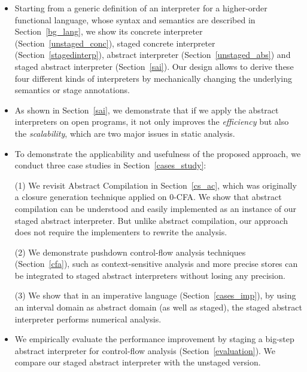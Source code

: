 \begin{itemize}
  \item Starting from a generic definition of an interpreter for a higher-order
    functional language, whose syntax and semantics are described in
    Section~\ref{bg_lang}, we show its concrete interpreter
    (Section~\ref{unstaged_conc}), staged concrete interpreter
    (Section~\ref{stagedinterp}), abstract interpreter (Section~\ref{unstaged_abs})
    and staged abstract interpreter (Section~\ref{sai}). Our design allows to
    derive these four different kinds of interpreters by mechanically changing the
    underlying semantics or stage annotations.
    
  \item As shown in Section~\ref{sai}, we demonstrate that if we apply the
    abstract interpreters on open programs, it not only improves the
    \textit{efficiency} but also the \textit{scalability}, which are two major
    issues in static analysis.
    
  \item To demonstrate the applicability and usefulness of the proposed
    approach, we conduct three case studies in Section~\ref{cases_study}:
    
    \subitem (1) We revisit Abstract Compilation \cite{Boucher:1996:ACN:647473.727587} in Section~\ref{cs_ac}, 
    which was originally a closure generation technique applied on 0-CFA.
    We show that abstract compilation can be understood and easily implemented
    as an instance of our staged abstract interpreter. But unlike abstract
    compilation, our approach does not require the implementers to rewrite the
    analysis.
    
    \subitem (2) We demonstrate pushdown control-flow analysis techniques
    (Section~\ref{cfa}), such as context-sensitive analysis and more precise
    stores can be integrated to staged abstract interpreters without losing any
    precision. 
    
    \subitem (3) We show that in an imperative language
    (Section~\ref{cases_imp}), by using an interval domain as abstract domain
    (as well as staged), the staged abstract interpreter performs numerical 
    analysis.
    
  \item We empirically evaluate the performance improvement by staging a
    big-step abstract interpreter for control-flow analysis
    (Section~\ref{evaluation}). We compare our staged abstract interpreter with the
    unstaged version.
\end{itemize}
